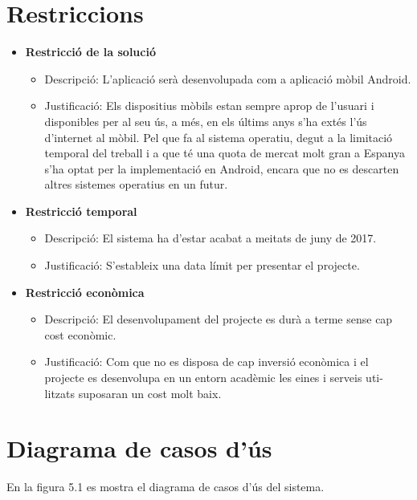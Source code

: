 \section{Restriccions}
\begin{itemize}
\item[]\textbf{Restricció de la solució}
\begin{itemize}
\item{}Descripció: L’aplicació serà desenvolupada com a aplicació mòbil Android.
\item{}Justificació: Els dispositius mòbils estan sempre aprop de l’usuari i
disponibles per al seu ús, a més, en els últims anys s’ha extés l’ús
d’internet al mòbil. Pel que fa al sistema operatiu, degut a la limitació temporal del treball i a que té una quota de mercat molt gran a
Espanya s’ha optat per la implementació en Android, encara que no
es descarten altres sistemes operatius en un futur.
\end{itemize}
\item[]\textbf{Restricció temporal}
\begin{itemize}
\item{}Descripció: El sistema ha d’estar acabat a meitats de juny de 2017.
\item{}Justificació: S’estableix una data límit per presentar el projecte.
\end{itemize}
\item[]\textbf{Restricció econòmica}
\begin{itemize}
\item{}Descripció: El desenvolupament del projecte es durà a terme sense
cap cost econòmic.
\item{}Justificació: Com que no es disposa de cap inversió econòmica i el
projecte es desenvolupa en un entorn acadèmic les eines i serveis uti-
litzats suposaran un cost molt baix.
\end{itemize}
\end{itemize}

\section{Diagrama de casos d'ús}
En la figura 5.1 es mostra el diagrama de casos d’ús del sistema.

